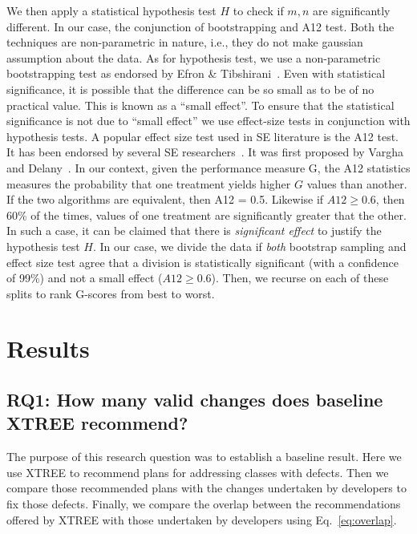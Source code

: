 \documentclass[sigconf, proceedings, 9pt]{acmart}
\newcommand{\eq}[1]{Eq.~\ref{eq:#1}}
\begin{document}
We then apply a statistical hypothesis test $H$ to check
if $m,n$ are significantly different. In our case, the conjunction of 
bootstrapping and A12 test. Both the techniques are non-parametric in nature, 
i.e., they do not make gaussian assumption about the data. As for hypothesis 
test, we use a non-parametric bootstrapping test as endorsed by Efron \& 
Tibshirani~\cite[p220-223]{efron93}. Even with statistical significance, it is 
possible that the difference
	can be so small as to be of no practical value. This is known as a ``small 
	effect''. To ensure that the statistical significance is not due to ``small 
	effect'' we use effect-size tests in conjunction with hypothesis tests. A 
	popular effect size test used in SE literature is the A12 test. It has been 
	endorsed by several SE researchers~\cite{leech2002call, poulding10, arcuri11, 
	shepperd12a, kampenes07, Kocaguneli2013:ep}. It was first proposed by Vargha 
	and Delany~\cite{vargha2000}. In our context,
	given the performance measure 
	G, the A12 statistics measures the
	probability that one treatment yields higher $G$ values than another. If the 
	two algorithms are equivalent, then A12 = 0.5. Likewise if $A12 \ge 0.6$, then 
	60\% of the times, values of one treatment are significantly greater that the 
	other. In such a case, it can be claimed that there is \textit{significant 
	effect} to justify the hypothesis test $H$. In our case, we divide the data if 
	\textit{both} bootstrap sampling and effect size test agree that a division is 
	statistically significant (with a
	confidence of 99\%) and not a small effect ($A12 \ge 0.6$). Then, we recurse 
	on each of these splits to rank G-scores from best to worst.




\section{Results}
\label{sect:results}

\subsection*{\textbf{RQ1: How many valid changes does baseline XTREE 
recommend?}}
\label{sect:rq1}


The purpose of this research question was to establish a baseline result. Here 
we use XTREE to recommend plans for addressing classes with defects. Then we 
compare those recommended plans with the changes undertaken by developers to 
fix those defects. Finally, we compare the overlap between the recommendations 
offered by XTREE with those undertaken by developers using \eq{overlap}.
\end{document}
